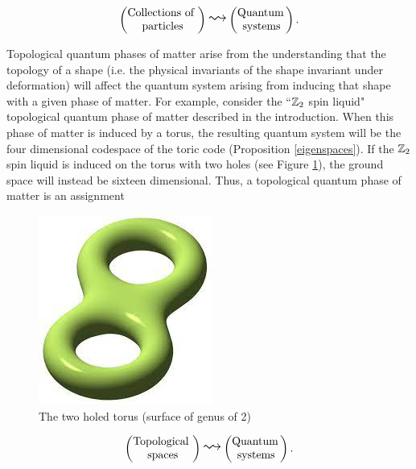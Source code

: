 \documentclass{article}
\theoremstyle{definition}
\numberwithin{figure}{section}
\begin{document}
$$
\begin{pmatrix}
\text{Collections of } \\
\text{particles}
\end{pmatrix}
\bigleadsto
\begin{pmatrix}
\text{Quantum\,} \\ \text{systems}
\end{pmatrix}.
$$

Topological quantum phases of matter arise from the understanding that the topology of a shape (i.e. the physical invariants of the shape invariant under deformation) will affect the quantum system arising from inducing that shape with a given phase of matter. For example, consider the ``$\mathbb{Z}_2$ spin liquid" topological quantum phase of matter described in the introduction. When this phase of matter is induced by a torus, the resulting quantum system will be the four dimensional codespace of the toric code (Proposition \ref{eigenspaces}). If the $\mathbb{Z}_2$ spin liquid is induced on the torus with two holes (see Figure \ref{fig:genus-two}), the ground space will instead be sixteen dimensional. Thus, a topological quantum phase of matter is an assignment

\begin{figure}
\begin{center}
\includegraphics[scale=0.25]{genus-two}
\caption{The two holed torus (surface of genus of 2)}
\label{fig:genus-two}
\end{center}
\end{figure}

$$
\begin{pmatrix}
\text{Topological } \\
\text{spaces}
\end{pmatrix}
\bigleadsto
\begin{pmatrix}
\text{Quantum\,} \\ \text{systems}
\end{pmatrix}.
$$
\end{document}
